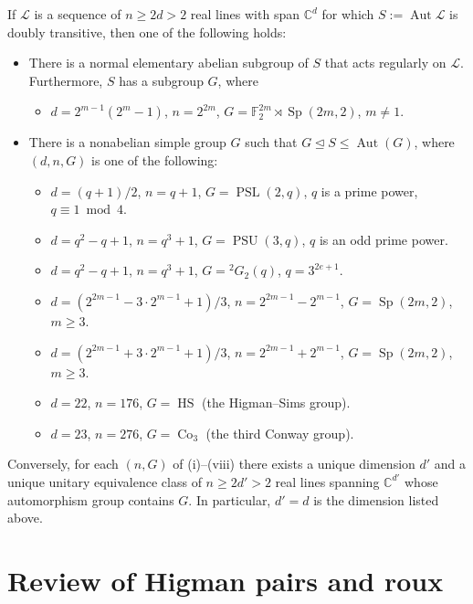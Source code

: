 \begin{proposition}
\label{prop:real2tran}
If $\mathscr{L}$ is a sequence of $n\geq 2d > 2$ real lines with span $\mathbb{C}^d$ for which $S:=\operatorname{Aut} \mathscr{L}$ is doubly transitive, then one of the following holds:
\begin{itemize}
\item[(I)]
There is a normal elementary abelian subgroup of $S$ that acts regularly on $\mathscr{L}$.
Furthermore, $S$ has a subgroup $G$, where
\begin{itemize}
\item[(i)]
$d = 2^{m-1}(2^m - 1)$, $n = 2^{2m}$, $G = \mathbb{F}_2^{2m} \rtimes \operatorname{Sp}(2m,2)$, $m \neq 1$.
\end{itemize}
\item[(II)]
There is a nonabelian simple group $G$ such that $G\unlhd S\leq\operatorname{Aut}(G)$, where $(d,n,G)$ is one of the following:
\begin{itemize}
\item[(ii)]
$d=(q+1)/2$, $n=q+1$, $G=\operatorname{PSL}(2,q)$, $q$ is a prime power, $q\equiv1\bmod4$.
\item[(iii)]
$d=q^2-q+1$, $n=q^3+1$, $G=\operatorname{PSU}(3,q)$, $q$ is an odd prime power.
\item[(iv)]
$d=q^2-q+1$, $n=q^3+1$, $G={}^2G_2(q)$, $q=3^{2e+1}$.
\item[(v)]
$d=(2^{2m-1}-3\cdot2^{m-1}+1)/3$, $n=2^{2m-1}-2^{m-1}$, $G=\operatorname{Sp}(2m,2)$, $m\geq3$.
\item[(vi)]
$d=(2^{2m-1}+3\cdot2^{m-1}+1)/3$, $n=2^{2m-1}+2^{m-1}$, $G=\operatorname{Sp}(2m,2)$, $m\geq3$.
\item[(vii)]
$d=22$, $n=176$, $G=\operatorname{HS}$ (the Higman--Sims group).
\item[(viii)]
$d=23$, $n=276$, $G=\operatorname{Co}_3$ (the third Conway group).
\end{itemize}
\end{itemize}
Conversely, for each $(n,G)$ of (i)--(viii) there exists a unique dimension $d'$ and a unique unitary equivalence class of $n \geq 2d' > 2$ real lines spanning $\mathbb{C}^{d'}$ whose automorphism group contains $G$.
In particular, $d' = d$ is the dimension listed above.
\end{proposition}



\section{Review of Higman pairs and roux}

